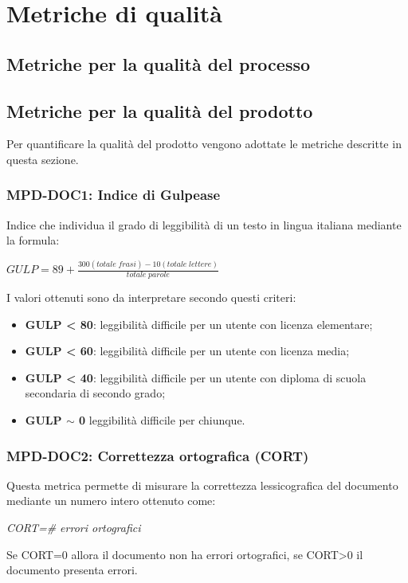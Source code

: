 \appendix
\section{Metriche di qualità}

\subsection{Metriche per la qualità del processo}

\subsection{Metriche per la qualità del prodotto} \label{_metricheprodotto}
Per quantificare la qualità del prodotto vengono adottate le metriche descritte in questa sezione.
\subsubsection{MPD-DOC1: Indice di Gulpease}
Indice che individua il grado di leggibilità di un testo in lingua italiana mediante la formula:
\begin{center}
    \(GULP=89+\frac{300(totale\; frasi)-10(totale\; lettere)}{totale\; parole}\)
\end{center}
I valori ottenuti sono da interpretare secondo questi criteri:
\begin{itemize}
    \item \textbf{GULP < 80}: leggibilità difficile per un utente con licenza elementare;
    \item \textbf{GULP < 60}: leggibilità difficile per un utente con licenza media;
    \item \textbf{GULP < 40}: leggibilità difficile per un utente con diploma di scuola secondaria di secondo grado;
    \item \textbf{GULP \(\sim\) 0} leggibilità difficile per chiunque.
\end{itemize}

\subsubsection{MPD-DOC2: Correttezza ortografica (CORT)}
Questa metrica permette di misurare la correttezza lessicografica del documento mediante un numero intero ottenuto come:
\begin{center}
    \textit{CORT=\# errori ortografici}
\end{center}
Se CORT=0 allora il documento non ha errori ortografici, se CORT>0 il documento presenta errori.